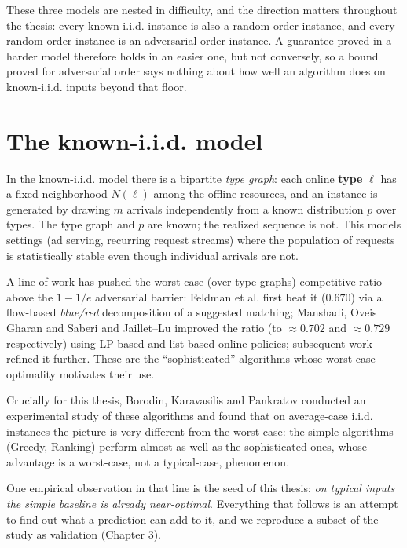 These three models are nested in difficulty, and the direction matters
throughout the thesis: every known-i.i.d. instance is also a
random-order instance, and every random-order instance is an
adversarial-order instance. A guarantee proved in a harder model
therefore holds in an easier one, but not conversely, so a bound proved
for adversarial order says nothing about how well an algorithm does on
known-i.i.d. inputs beyond that floor.

\section{The known-i.i.d. model}

In the known-i.i.d. model there is a bipartite \emph{type graph}: each
online \textbf{type} \(\ell\) has a fixed neighborhood \(N(\ell)\) among
the offline resources, and an instance is generated by drawing \(m\)
arrivals independently from a known distribution \(p\) over types. The
type graph and \(p\) are known; the realized sequence is not. This
models settings (ad serving, recurring request streams) where the
population of requests is statistically stable even though individual
arrivals are not.

A line of work has pushed the worst-case (over type graphs) competitive
ratio above the \(1-1/e\) adversarial barrier: Feldman et al.
\autocite{feldman2009online} first beat it (\(0.670\)) via a flow-based
\emph{blue/red} decomposition of a suggested matching; Manshadi, Oveis
Gharan and Saberi \autocite{manshadi2012online} and Jaillet--Lu
\autocite{jailletlu2014online} improved the ratio (to \(\approx0.702\)
and \(\approx0.729\) respectively) using LP-based and list-based online
policies; subsequent work refined it further. These are the
``sophisticated'' algorithms whose worst-case optimality motivates their
use.

Crucially for this thesis, Borodin, Karavasilis and Pankratov
\autocite{borodin2018experimental} conducted an experimental study of
these algorithms and found that on average-case i.i.d. instances the
picture is very different from the worst case: the simple algorithms
(Greedy, Ranking) perform almost as well as the sophisticated ones,
whose advantage is a worst-case, not a typical-case, phenomenon.

One empirical observation in that line is the seed of this thesis:
\emph{on typical inputs the simple baseline is already near-optimal}.
Everything that follows is an attempt to find out what a prediction can
add to it, and we reproduce a subset of the study as validation (Chapter
3).

